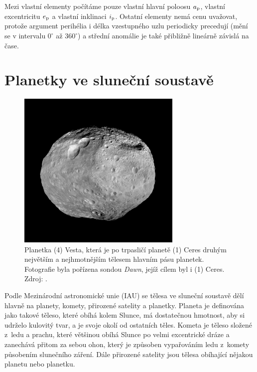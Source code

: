 \documentclass[A4paper, 12pt, oneside]{book}%
\newcommand{\I}[1]{\textit{#1}}
\begin{document}
Mezi vlastní elementy počítáme pouze vlastní hlavní poloosu $a_{\rm p}$, vlastní excentricitu $e_{\rm p}$ a vlastní inklinaci $i_{\rm p}$. Ostatní elementy nemá cenu uvažovat, protože argument perihélia i délka vzestupného uzlu periodicky precedují (mění se v intervalu $0^\circ$ až $360^\circ$) a střední anomálie je také přibližně lineárně závislá na čase.

\cite{sidlichovsky96}

\chapter{Planetky ve sluneční soustavě}

\begin{figure}[!htb]
	\centering
	\includegraphics[width=0.7\textwidth]{obr/vesta.jpg}
	\caption{Planetka (4) Vesta, která je po trpasličí planetě (1) Ceres druhým největším a nejhmotnějším tělesem hlavním pásu planetek. Fotografie byla pořízena sondou \I{Dawn}, jejíž cílem byl i (1) Ceres. Zdroj: \cite{jplvesta}.}
\end{figure}

Podle Mezinárodní astronomické unie (IAU) se tělesa ve sluneční soustavě dělí hlavně na planety, komety, přirozené satelity a planetky. Planeta je definována jako takové těleso, které obíhá kolem Slunce, má dostatečnou hmotnost, aby si udrželo kulovitý tvar, a je  svoje okolí od ostatních těles. Kometa je těleso složené z~ledu a prachu, které většinou obíhá Slunce po velmi excentrické dráze a zanechává přitom za sebou ohon, který je způsoben vypařováním ledu z~komety působením slunečního záření. Dále přirozené satelity jsou tělesa obíhající nějakou planetu nebo planetku. 
\end{document}
